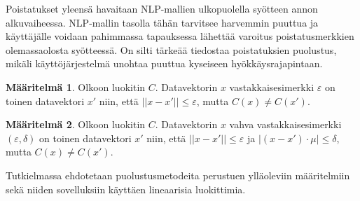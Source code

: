 Poistatukset yleensä havaitaan NLP-mallien ulkopuolella syötteen annon alkuvaiheessa. NLP-mallin tasolla tähän tarvitsee harvemmin puuttua ja käyttäjälle voidaan pahimmassa tapauksessa lähettää varoitus poistatusmerkkien olemassaolosta syötteessä. On silti tärkeää tiedostaa poistatuksien puolustus, mikäli käyttöjärjestelmä unohtaa puuttua kyseiseen hyökkäysrajapintaan. \citep{boucher2021bad}

\theoremstyle{definition}
\newtheorem{definition}{Määritelmä}

\begin{definition}
  Olkoon luokitin $C$. Datavektorin $x$ vastakkaisesimerkki $\varepsilon$ on toinen datavektori $x'$ niin, että $||x-x'||\leq \varepsilon$, mutta $C(x) \not = C(x')$.
\end{definition}

\begin{definition}
  Olkoon luokitin $C$. Datavektorin $x$ vahva vastakkaisesimerkki $(\varepsilon, \delta)$ on toinen datavektori $x'$ niin, että $||x-x'||\leq \varepsilon$ ja $|(x-x')\cdot \mu|\leq\delta$, mutta $C(x) \not = C(x')$.
\end{definition}

Tutkielmassa ehdotetaan puolustusmetodeita perustuen ylläoleviin määritelmiin sekä niiden sovelluksiin käyttäen lineaarisia luokittimia.